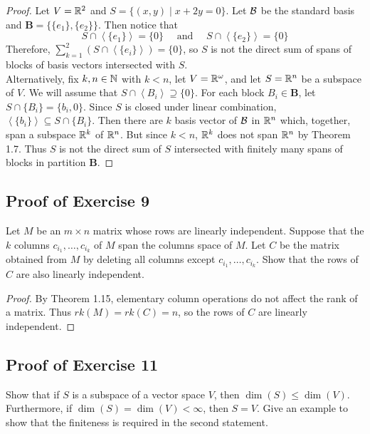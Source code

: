\begin{proof}
Let $V={\mathbb{R}}^2$ and $S=\{(x,y)\mid x+2y = 0\}$. Let ${\mathcal{B}}$ be the standard basis and $\mathbf{B}=\{\{e_1\},\{e_2\}\}$. Then notice that
\[
	S\cap\left\langle \{e_1\}\right\rangle = \{0\}
	\quad
	\text{ and }
	\quad
	S\cap\left\langle \{e_2\}\right\rangle = \{0\}
\]
Therefore, $\displaystyle\sum_{k=1}^2 \left(S\cap\left\langle\{e_i\}\right\rangle\right) = \{0\}$, so $S$ is not the direct sum of spans of blocks of basis vectors intersected with $S$.\\

Alternatively, fix $k,n\in{\mathbb{N}}$ with $k<n$, let $V={\mathbb{R}}^\omega$, and let $S={\mathbb{R}}^n$ be a subspace of $V$. We will assume that $S\cap\left\langle B_i\right\rangle\supseteq\{0\}$. For each block $B_i\in\textbf{B}$, let $S\cap\{B_i\} = \{b_i,0\}$. Since $S$ is closed under linear combination, $\left\langle \{b_i\}\right\rangle\subseteq S\cap\{B_i\}$. Then there are $k$ basis vector of ${\mathcal{B}}$ in ${\mathbb{R}}^n$ which, together, span a subspace ${\mathbb{R}}^k$ of ${\mathbb{R}}^n$. But since $k<n$, ${\mathbb{R}}^k$ does not span ${\mathbb{R}}^n$ by Theorem 1.7. Thus $S$ is not the direct sum of $S$ intersected with finitely many spans of blocks in partition $\mathbf{B}$.
\end{proof}

\vfill
\pagebreak

\subsection{Proof of Exercise 9}
Let $M$ be an $m\times n$ matrix whose rows are linearly independent. Suppose that the $k$ columns $c_{i_1},\ldots,c_{i_k}$ of $M$ span the columns space of $M$. Let $C$ be the matrix obtained from $M$ by deleting all columns except $c_{i_1},\ldots,c_{i_k}$. Show that the rows of $C$ are also linearly independent.

\begin{proof}
By Theorem 1.15,  elementary column operations do not affect the rank of a matrix. Thus $rk(M) = rk(C) = n$, so the rows of $C$ are linearly independent.
\end{proof}

\vfill
\pagebreak

\subsection{Proof of Exercise 11}
Show that if $S$ is a subspace of a vector space $V$, then $\dim(S)\leq\dim(V)$. Furthermore, if $\dim(S)=\dim(V)<\infty$, then $S=V$. Give an example to show that the finiteness is required in the second statement.

